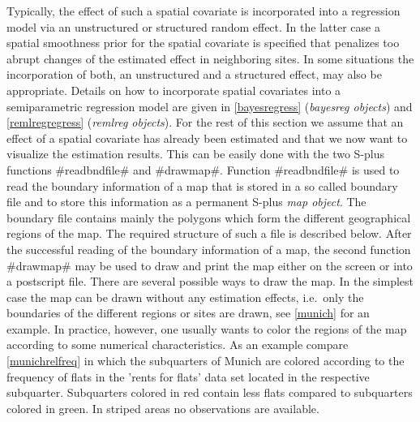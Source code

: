 Typically, the effect of such a spatial covariate is incorporated
into a regression model via an unstructured or structured random
effect. In the latter case a spatial smoothness prior for the
spatial covariate is specified that penalizes too abrupt changes of
the estimated effect in neighboring sites. In some situations the
incorporation of both, an unstructured and a structured effect, may
also be appropriate. Details on how to incorporate spatial
covariates into a semiparametric regression  model are given in
\autoref{bayesregress} ({\em bayesreg objects}) and
\autoref{remlregregress} ({\em remlreg objects}). For the rest of
this section we assume that an effect of a spatial covariate has
already been estimated and that we now want to visualize the
estimation results. This can be easily done with the two S-plus
functions #readbndfile# and #drawmap#. Function #readbndfile# is
used to read the boundary information of a map that is stored in a
so called boundary file and to store this information as a permanent
S-plus {\em map object}. The boundary file contains mainly the
polygons which form the different geographical regions of the map.
The required structure of such a file is described below. After the
successful reading of the boundary information of a map, the second
function #drawmap# may be used to draw and print the map either on
the screen or into a postscript file. There are several possible
ways to draw the map. In the simplest case the map can be drawn
without any estimation effects, i.e.~only the boundaries of the
different regions or sites are drawn, see \autoref{munich} for an
example. In practice, however, one usually wants to color the
regions of the map according to some numerical characteristics. As
an example compare \autoref{munichrelfreq} in which the subquarters
of Munich are colored according to the frequency of flats in the
'rents for flats' data set located in the respective subquarter.
Subquarters colored in red contain less flats compared to
subquarters colored in green. In striped areas no observations are
available.

